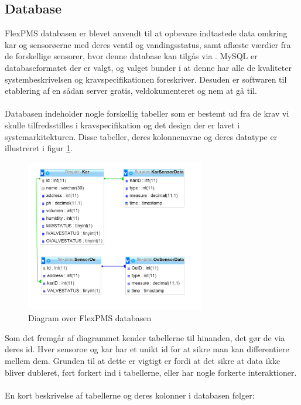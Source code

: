 \subsection{Database}
FlexPMS databasen er blevet anvendt til at opbevare indtastede data omkring kar og sensorøerne med deres ventil og vandingsstatus, samt aflæste værdier fra de forskellige sensorer, hvor denne database kan tilgås via . MySQL er databaseformatet der er valgt, og valget bunder i at denne har alle de kvaliteter systembeskrivelsen og kravspecifikationen foreskriver. Desuden er softwaren til etablering af en sådan server gratis, veldokumenteret og nem at gå til.
\\\\
Databasen indeholder nogle forskellig tabeller som er bestemt ud fra de krav vi skulle tilfredsstilles i kravspecifikation og det design der er lavet i systemarkitekturen. Disse tabeller, deres kolonnenavne og deres datatype er illustreret i figur \ref{fig:DB}. 

\begin{figure}[H]
    \centering
    \includegraphics[width=0.7\textwidth]{SoftwareArkitektur/GUI/Intro_GUI_DB/photo/DB_diagram.PNG}
    \caption{Diagram over FlexPMS databasen}
    \label{fig:DB}
\end{figure}

Som det fremgår af diagrammet kender tabellerne til hinanden, det gør de via deres id. Hver \gls{sensoroe} og \gls{kar} har et unikt id for at sikre man kan differentiere mellem dem. Grunden til at dette er vigtigt er fordi at det sikre at data ikke bliver dubleret, ført forkert ind i tabellerne, eller har nogle forkerte interaktioner.
\\\\
En kort beskrivelse af tabellerne og deres kolonner i databasen følger:

